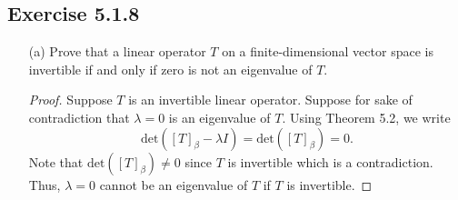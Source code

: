 \subsection*{Exercise 5.1.8} 
\begin{enumerate}
    \item[(a)] Prove that a linear operator \( T  \) on a finite-dimensional vector space is invertible if and only if zero is not an eigenvalue of \( T  \).
        \begin{proof}
        Suppose \( T \) is an invertible linear operator. Suppose for sake of contradiction that \( \lambda = 0   \) is an eigenvalue of \( T  \). Using Theorem 5.2, we write 
        \[  \text{det}([T]_{\beta} - \lambda I) = \text{det} ([T]_{\beta}) = 0.  \]
        Note that \( \text{det}([T]_{\beta}) \neq  0  \) since \( T  \) is invertible which is a contradiction. Thus, \( \lambda = 0 \) cannot be an eigenvalue of \( T  \) if \( T  \) is invertible.


\end{proof}
\end{enumerate}
